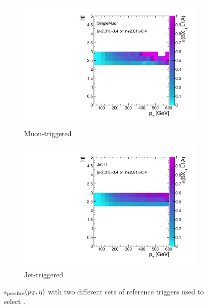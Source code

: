 \begin{figure}[]
    \begin{center}
        \begin{subfigure}[t]{0.49\textwidth}
            \includegraphics[width=\textwidth]{figures/vbf/triggers/SingleMuon_spike_finor_pteta_ratio.pdf}
            \caption{Muon-triggered}
        \end{subfigure}
        \begin{subfigure}[t]{0.49\textwidth}
            \includegraphics[width=\textwidth]{figures/vbf/triggers/JetHT_spike_finor_pteta_ratio.pdf}
            \caption{Jet-triggered}
        \end{subfigure}
        \caption{$\epsilon_\text{pre-fire}(p_\mathrm{T},\eta)$ with two different sets of reference triggers used to select .}
        \label{fig:vbf:pre_eff2_pteta}
    \end{center}
\end{figure}
